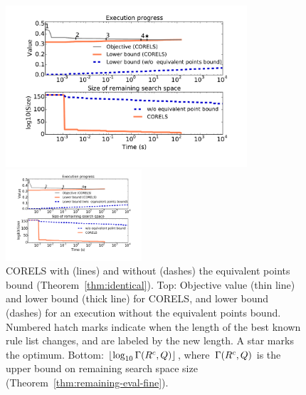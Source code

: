 \begin{figure}[t!]
\begin{center}
\begin{arxiv}
\includegraphics[width=0.8\textwidth]{figs/compas_execution-remaining-space.pdf}
\end{arxiv}
\begin{kdd}
\includegraphics[trim={20mm, 25mm, 24mm, 15mm}, width=0.45\textwidth]{figs/compas_execution-remaining-space.pdf}
\end{kdd}
\end{center}
\caption{CORELS with (lines) and without
(dashes) the equivalent points bound (Theorem~\ref{thm:identical}).
%
%
Top: Objective value (thin line) and lower bound (thick line) for CORELS,
and lower bound (dashes) for an execution without the equivalent points bound.
%
Numbered hatch marks
indicate when the length of the best known rule list changes,
and are labeled by the new length.
%
A star marks the optimum.
%
%
Bottom: $\lfloor \log_{10} \Gamma({R^c}, Q) \rfloor$,
where~$\Gamma({R^c}, Q)$
is the upper bound on remaining search space size
(Theorem~\ref{thm:remaining-eval-fine}).
}
\label{fig:objective}
\end{figure}

